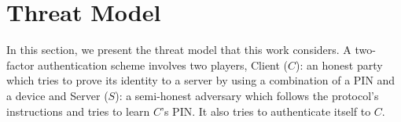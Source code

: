 


 
\vspace{-3mm}
\section{Threat Model}\label{sec::model}
 \vspace{-2mm}

In this section, we present the threat model that this work considers. A two-factor authentication scheme involves two players,
%
%
%
%
 {Client ($C$)}: an honest party which tries to prove its identity to a server by using a combination of a PIN and a device and {Server ($S$)}:  a semi-honest adversary which follows the protocol's instructions and tries to learn $C$'s PIN. It also tries to authenticate itself to $C$.  



